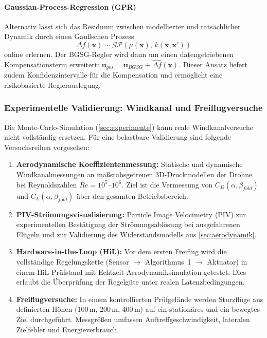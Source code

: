 ﻿\documentclass[12pt,a4paper]{article}
\theoremstyle{remark}
\begin{document}
	\paragraph{Gaussian-Process-Regression (GPR)} Alternativ lässt sich das Residuum zwischen modellierter und tatsächlicher Dynamik durch einen Gaußschen Prozess
	\begin{equation}
		\Delta f(\mathbf{x}) \sim \mathcal{GP}(\mu(\mathbf{x}),\, k(\mathbf{x}, \mathbf{x}'))
	\end{equation}
	online erlernen. Der BGSG-Regler wird dann um einen datengetriebenen Kompensationsterm erweitert: $\mathbf{u}_{ges} = \mathbf{u}_{BGSG} + \widehat{\Delta f}(\mathbf{x})$. Dieser Ansatz liefert zudem Konfidenzintervalle für die Kompensation und ermöglicht eine risikobasierte Reglerauslegung.

	\subsubsection{Experimentelle Validierung: Windkanal und Freiflugversuche}

	Die Monte-Carlo-Simulation (\cref{sec:experimente}) kann reale Windkanalversuche nicht vollständig ersetzen. Für eine belastbare Validierung sind folgende Versuchsreihen vorgesehen:

	\begin{enumerate}
		\item \textbf{Aerodynamische Koeffizientenmessung:} Statische und dynamische Windkanalmessungen an maßstabsgetreuen \mbox{3D-Druckmodellen} der Drohne bei Reynoldszahlen $Re = 10^5$--$10^6$. Ziel ist die Vermessung von $C_D(\alpha, \beta_{fold})$ und $C_L(\alpha, \beta_{fold})$ über den gesamten Betriebsbereich.
		\item \textbf{PIV-Strömungsvisualisierung:} Particle Image Velocimetry (PIV) zur experimentellen Bestätigung der Strömungsablösung bei ausgefahrenen Flügeln und zur Validierung des Widerstandsmodells aus \cref{sec:aerodynamik}.
		\item \textbf{Hardware-in-the-Loop (HiL):} Vor dem ersten Freiflug wird die vollständige Regelungskette (Sensor $\to$ Algorithmus~1 $\to$ Aktuator) in einem HiL-Prüfstand mit Echtzeit-Aerodynamiksimulation getestet. Dies erlaubt die Überprüfung der Regelgüte unter realen Latenzbedingungen.
		\item \textbf{Freiflugversuche:} In einem kontrollierten Prüfgelände werden Sturzflüge aus definierten Höhen (100\,m, 200\,m, 400\,m) auf ein stationäres und ein bewegtes Ziel durchgeführt. Messgrößen umfassen Auftreffgeschwindigkeit, lateralen Zielfehler und Energieverbrauch.
	\end{enumerate}
\end{document}
